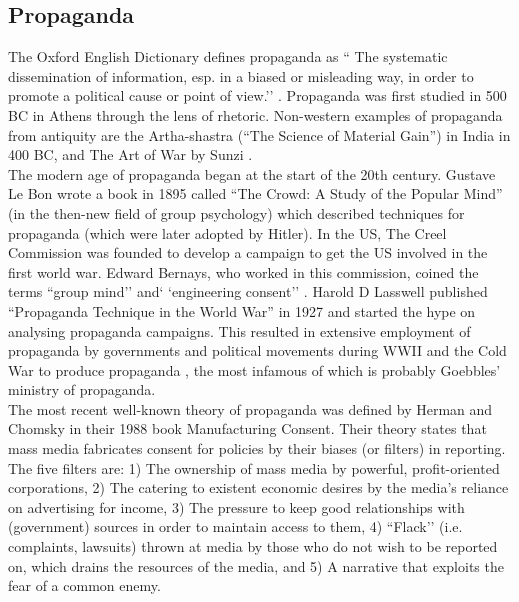 \documentclass[10pt,a4paper]{article}
\begin{document}
\subsection{Propaganda} 
The Oxford English Dictionary defines propaganda as `` The systematic dissemination of information, esp. in a biased or misleading way, in order to promote a political cause or point of view.’’ \citep{OEDprop}. Propaganda was first studied in 500 BC in Athens through the lens of rhetoric. Non-western examples of propaganda from antiquity are the Artha-shastra (“The Science of Material Gain”) in India in 400 BC, and The Art of War by Sunzi \citep{Brittanica2020}. \\

The modern age of propaganda began at the start of the 20th century. Gustave Le Bon wrote a book in 1895 called “The Crowd: A Study of the Popular Mind” (in the then-new field of group psychology) which described techniques for propaganda (which were later adopted by Hitler). In the US, The Creel Commission was founded to develop a campaign to get the US involved in the first world war. Edward Bernays, who worked in this commission, coined the terms ``group mind’’ and` `engineering consent’’ \citep{Kim2007}. Harold D Lasswell published “Propaganda Technique in the World War” in 1927 and started the hype on analysing propaganda campaigns. This resulted in extensive employment of propaganda by governments and political movements during WWII and the Cold War to produce propaganda \citep{Brittanica2020}, the most infamous of which is probably Goebbles’ ministry of propaganda. \\

The most recent well-known theory of propaganda was defined by Herman and Chomsky in their 1988 book Manufacturing Consent. Their theory states that mass media fabricates consent for policies by their biases (or filters) in reporting. The five filters are: 1) The ownership of mass media by powerful, profit-oriented corporations, 2) The catering to existent economic desires by the media’s reliance on advertising for income, 3) The pressure to keep good relationships with (government) sources in order to maintain access to them, 4) ``Flack’’ (i.e. complaints, lawsuits) thrown at media by those who do not wish to be reported on, which drains the resources of the media, and 5) A narrative that exploits the fear of a common enemy. \\
\end{document}
